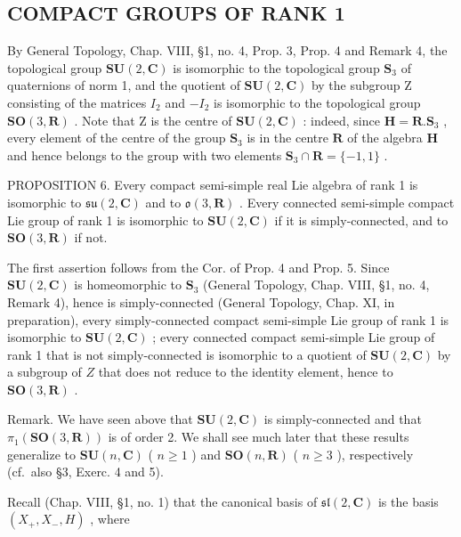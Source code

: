 \subsection{COMPACT GROUPS OF RANK 1}

By General Topology, Chap. VIII, §1, no. 4, Prop. 3, Prop. 4 and Remark 4, the topological group \(\mathbf{SU}(2,\mathbf{C})\) is isomorphic to the topological group \(\mathbf{S}_3\) of quaternions of norm 1, and the quotient of \(\mathbf{SU}(2,\mathbf{C})\) by the subgroup Z consisting of the matrices \(I_2\) and \(-I_2\) is isomorphic to the topological group \(\mathbf{SO}(3,\mathbf{R})\) . Note that Z is the centre of \(\mathbf{SU}(2,\mathbf{C})\) : indeed, since \(\mathbf{H} = \mathbf{R}.\mathbf{S}_3\) , every element of the centre of the group \(\mathbf{S}_3\) is in the centre \(\mathbf{R}\) of the algebra \(\mathbf{H}\) and hence belongs to the group with two elements \(\mathbf{S}_3 \cap \mathbf{R} = \{-1,1\}\) .

PROPOSITION 6. Every compact semi-simple real Lie algebra of rank 1 is isomorphic to \(\mathfrak{su}(2,\mathbf{C})\) and to \(\mathfrak{o}(3,\mathbf{R})\) . Every connected semi-simple compact Lie group of rank 1 is isomorphic to \(\mathbf{SU}(2,\mathbf{C})\) if it is simply-connected, and to \(\mathbf{SO}(3,\mathbf{R})\) if not.

The first assertion follows from the Cor. of Prop. 4 and Prop. 5. Since \(\mathbf{SU}(2,\mathbf{C})\) is homeomorphic to \(\mathbf{S}_3\) (General Topology, Chap. VIII, §1, no. 4, Remark 4), hence is simply-connected (General Topology, Chap. XI, in preparation), every simply-connected compact semi-simple Lie group of rank 1 is isomorphic to \(\mathbf{SU}(2,\mathbf{C})\) ; every connected compact semi-simple Lie group of rank 1 that is not simply-connected is isomorphic to a quotient of \(\mathbf{SU}(2,\mathbf{C})\) by a subgroup of \(Z\) that does not reduce to the identity element, hence to \(\mathbf{SO}(3,\mathbf{R})\) .

Remark. We have seen above that \(\mathbf{SU}(2,\mathbf{C})\) is simply-connected and that \(\pi_{1}(\mathbf{SO}(3,\mathbf{R}))\) is of order 2. We shall see much later that these results generalize to \(\mathbf{SU}(n,\mathbf{C})\) ( \(n\geq1\) ) and \(\mathbf{SO}(n,\mathbf{R})\) ( \(n\geq3\) ), respectively (cf.~also §3, Exerc. 4 and 5).

Recall (Chap. VIII, §1, no. 1) that the canonical basis of \(\mathfrak{sl}(2,\mathbf{C})\) is the basis \((X_{+},X_{-},H)\) , where

